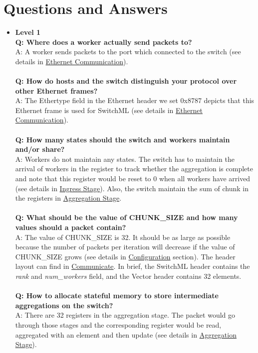 \documentclass[a4paper,11pt]{article}
\begin{document}
\newpage
\section{Questions and Answers}
\begin{itemize}
    \item \textbf{Level 1} \\
    \textbf{Q: Where does a worker actually send packets to? \\}
    A: A worker sends packets to the port which connected to the switch (see details in \hyperref[level1comm]{Ethernet Communication}). \\\\
    \textbf{Q: How do hosts and the switch distinguish your protocol over other Ethernet frames?} \\
    A: The Ethertype field in the Ethernet header we set 0x8787 depicts that this Ethernet frame is used for SwitchML (see details in \hyperref[level1comm]{Ethernet Communication}). \\\\
    \textbf{Q: How many states should the switch and workers maintain and/or share?} \\
    A: Workers do not maintain any states. The switch has to maintain the arrival of workers in the register to track whether the aggregation is complete and note that this register would be reset to 0 when all workers have arrived (see details in \hyperref[ingstg]{Ingress Stage}). Also, the switch maintain the sum of chunk in the registers in \hyperref[aggstg]{Aggregation Stage}.\\\\
    \textbf{Q: What should be the value of CHUNK\_SIZE and how many values should a packet contain? \\}
    A: The value of CHUNK\_SIZE is 32. It should be as large as possible because the number of packets per iteration will decrease if the value of CHUNK\_SIZE grows (see details in \hyperref[chunksize]{Configuration} section). The header layout can find in \hyperref[sec:communicate]{Communicate}. In brief, the SwitchML header contains the \textit{rank} and \textit{num\_workers} field, and the Vector header contains 32 elements.\\\\
    \textbf{Q: How to allocate stateful memory to store intermediate aggregations on the switch? \\}
    A: There are 32 registers in the aggregation stage. The packet would go through those stages and the corresponding register would be read, aggregated with an element and then update (see details in \hyperref[aggstg]{Aggregation Stage}). \\\\

\end{itemize}
\end{document}
